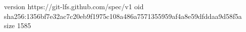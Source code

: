 version https://git-lfs.github.com/spec/v1
oid sha256:1356bf7e32ac7c20eb9f1975c108a486a7571355959af4a8e59dfddaa9d58f5a
size 1585
